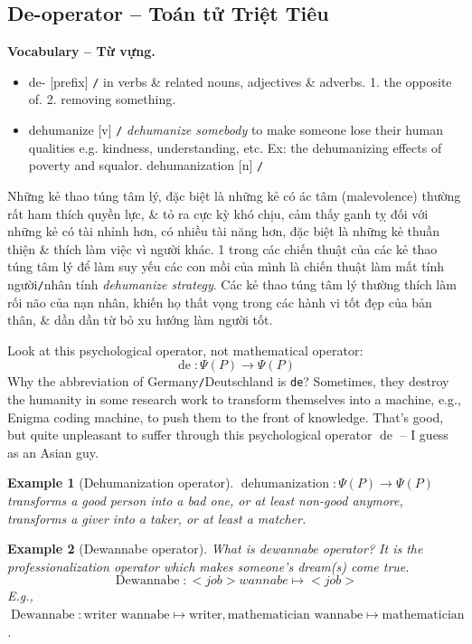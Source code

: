 \documentclass[12pt,twoside]{book}
\newtheorem{example}{Example}
\begin{document}
\subsection{De-operator -- Toán tử Triệt Tiêu}
\textbf{\textsf{\small Vocabulary -- Từ vựng.}}
\begin{itemize}\small
	\item {\sf de-} [prefix] {\tt/} in verbs \& related nouns, adjectives \& adverbs. 1. the opposite of. 2. removing something.
	\item {\sf dehumanize} [v] {\tt/} {\it dehumanize somebody} to make someone lose their human qualities e.g. kindness, understanding, etc. Ex: the dehumanizing effects of poverty and squalor. {\sf dehumanization} [n] {\tt/}
\end{itemize}
Những kẻ thao túng tâm lý, đặc biệt là những kẻ có ác tâm (malevolence) thường rất ham thích quyền lực, \& tỏ ra cực kỳ khó chịu, cảm thấy ganh tỵ đối với những kẻ có tài nhỉnh hơn, có nhiều tài năng hơn, đặc biệt là những kẻ thuần thiện \& thích làm việc vì người khác. 1 trong các chiến thuật của các kẻ thao túng tâm lý để làm suy yếu các con mồi của mình là chiến thuật làm mất tính người{\tt/}nhân tính {\it dehumanize strategy}. Các kẻ thao túng tâm lý thường thích làm rối não của nạn nhân, khiến họ thất vọng trong các hành vi tốt đẹp của bản thân, \& dần dần từ bỏ xu hướng làm người tốt.

Look at this psychological operator, not mathematical operator:
\begin{equation}
	\operatorname{de}:\Psi(P)\to\Psi(P)
\end{equation}
Why the abbreviation of Germany{\tt/}Deutschland is {\tt de}? Sometimes, they destroy the humanity in some research work to transform themselves into a machine, e.g., Enigma coding machine, to push them to the front of knowledge. That's good, but quite unpleasant to suffer through this psychological operator $\operatorname{de}$ -- I guess as an Asian guy.

\begin{example}[Dehumanization operator]
	$\operatorname{dehumanization}:\Psi(P)\to\Psi(P)$ transforms a good person into a bad one, or at least non-good anymore, transforms a giver into a taker, or at least a matcher.
\end{example}

\begin{example}[Dewannabe operator]
	What is dewannabe operator? It is the professionalization operator which makes someone's dream(s) come true.
	\begin{equation}
		\operatorname{Dewannabe}: <job> wannabe \mapsto <job>
	\end{equation}
	E.g., $\operatorname{Dewannabe}:\mbox{writer wannabe}\mapsto\mbox{writer},\mbox{mathematician wannabe}\mapsto\mbox{mathematician}$.
\end{example}
\end{document}
